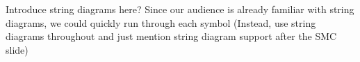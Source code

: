 \begin{frame} %
    Introduce string diagrams here? Since our audience is already familiar with string diagrams, we could quickly run through each symbol
    (Instead, use string diagrams throughout and just mention string diagram support after the SMC slide)
\end{frame}
